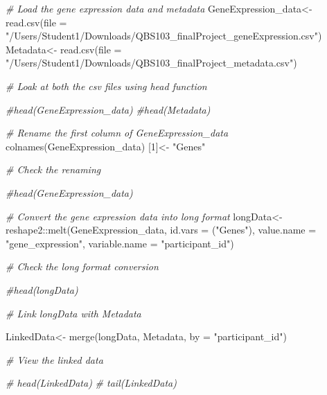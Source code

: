 \documentclass[
]{article}
\newenvironment{Shaded}{\begin{snugshade}}{\end{snugshade}}
\newcommand{\AttributeTok}[1]{\textcolor[rgb]{0.77,0.63,0.00}{#1}}
\newcommand{\CommentTok}[1]{\textcolor[rgb]{0.56,0.35,0.01}{\textit{#1}}}
\newcommand{\DecValTok}[1]{\textcolor[rgb]{0.00,0.00,0.81}{#1}}
\newcommand{\FunctionTok}[1]{\textcolor[rgb]{0.00,0.00,0.00}{#1}}
\newcommand{\NormalTok}[1]{#1}
\newcommand{\OtherTok}[1]{\textcolor[rgb]{0.56,0.35,0.01}{#1}}
\newcommand{\SpecialCharTok}[1]{\textcolor[rgb]{0.00,0.00,0.00}{#1}}
\newcommand{\StringTok}[1]{\textcolor[rgb]{0.31,0.60,0.02}{#1}}
\begin{document}
\begin{Shaded}
\begin{Highlighting}[]
\CommentTok{\# Load the gene expression data and metadata}
\NormalTok{GeneExpression\_data}\OtherTok{\textless{}{-}} \FunctionTok{read.csv}\NormalTok{(}\AttributeTok{file =} \StringTok{"/Users/Student1/Downloads/QBS103\_finalProject\_geneExpression.csv"}\NormalTok{)}
\NormalTok{Metadata}\OtherTok{\textless{}{-}} \FunctionTok{read.csv}\NormalTok{(}\AttributeTok{file =}  \StringTok{"/Users/Student1/Downloads/QBS103\_finalProject\_metadata.csv"}\NormalTok{)}

\CommentTok{\# Loak at both the csv files using head function}

  \CommentTok{\#head(GeneExpression\_data)}
  \CommentTok{\#head(Metadata)}
\end{Highlighting}
\end{Shaded}

\begin{Shaded}
\begin{Highlighting}[]
\CommentTok{\# Rename the first column of GeneExpression\_data}
\FunctionTok{colnames}\NormalTok{(GeneExpression\_data) [}\DecValTok{1}\NormalTok{]}\OtherTok{\textless{}{-}} \StringTok{"Genes"}

\CommentTok{\# Check the renaming}

  \CommentTok{\#head(GeneExpression\_data)}
\end{Highlighting}
\end{Shaded}

\begin{Shaded}
\begin{Highlighting}[]
\CommentTok{\# Convert the gene expression data into long format}
\NormalTok{longData}\OtherTok{\textless{}{-}}\NormalTok{ reshape2}\SpecialCharTok{::}\FunctionTok{melt}\NormalTok{(GeneExpression\_data, }\AttributeTok{id.vars =}\NormalTok{ (}\StringTok{"Genes"}\NormalTok{),}
                          \AttributeTok{value.name =} \StringTok{"gene\_expression"}\NormalTok{, }\AttributeTok{variable.name =} \StringTok{"participant\_id"}\NormalTok{)}

\CommentTok{\# Check the long format conversion}

  \CommentTok{\#head(longData)}
\end{Highlighting}
\end{Shaded}

\begin{Shaded}
\begin{Highlighting}[]
\CommentTok{\# Link longData with Metadata}

\NormalTok{LinkedData}\OtherTok{\textless{}{-}} \FunctionTok{merge}\NormalTok{(longData, Metadata, }\AttributeTok{by =} \StringTok{"participant\_id"}\NormalTok{)}

\CommentTok{\# View the linked data}

 \CommentTok{\# head(LinkedData)}
 \CommentTok{\# tail(LinkedData)}
\end{Highlighting}
\end{Shaded}
\end{document}
